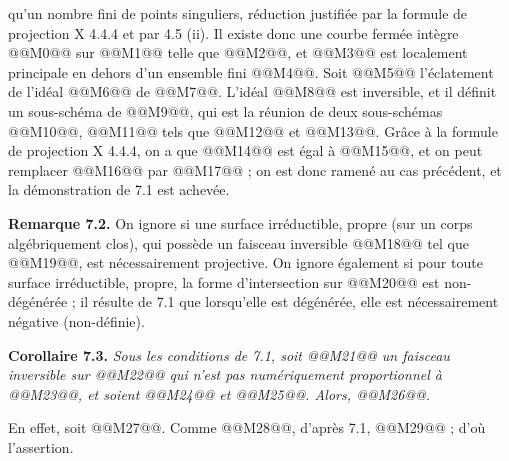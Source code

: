 
qu'un
nombre fini de points singuliers, r\'eduction justifi\'ee par la formule de projection X 4.4.4 et par 4.5 (ii). Il existe donc une courbe ferm\'ee int\`egre @@M0@@ sur @@M1@@ telle que @@M2@@, et @@M3@@ est localement principale en dehors d'un ensemble fini @@M4@@. Soit @@M5@@ l'\'eclatement de l'id\'eal @@M6@@ de @@M7@@. L'id\'eal @@M8@@ est inversible, et il d\'efinit un sous-sch\'ema de @@M9@@, qui est la r\'eunion de deux sous-sch\'emas @@M10@@, @@M11@@ tels que @@M12@@ et @@M13@@. Gr\^ace \`a la formule de projection X 4.4.4, on a que @@M14@@ est \'egal \`a @@M15@@, et on peut remplacer @@M16@@ par @@M17@@ ; on est donc ramen\'e au cas pr\'ec\'edent, et la d\'emonstration de 7.1 est achev\'ee.

\textbf{Remarque 7.2.} On ignore si une surface irr\'eductible, propre (sur un corps alg\'ebriquement clos), qui poss\`ede un faisceau inversible @@M18@@ tel que @@M19@@, est n\'ecessairement projective. On ignore \'egalement si pour toute surface irr\'eductible, propre, la forme d'intersection sur @@M20@@ est non-d\'eg\'en\'er\'ee ; il r\'esulte de 7.1 que lorsqu'elle est d\'eg\'en\'er\'ee, elle est n\'ecessairement n\'egative (non-d\'efinie).

\textbf{Corollaire 7.3.} \emph{Sous les conditions de 7.1, soit @@M21@@ un faisceau inversible sur @@M22@@ qui n'est pas num\'eriquement proportionnel \`a @@M23@@, et soient @@M24@@ et @@M25@@. Alors, @@M26@@.}

En effet, soit @@M27@@. Comme @@M28@@, d'apr\`es 7.1, @@M29@@ ; d'o\`u l'assertion.

